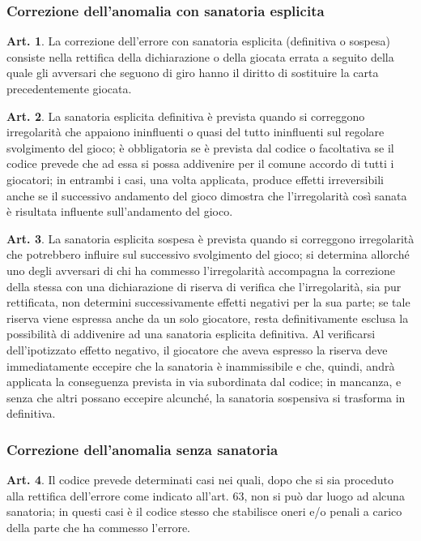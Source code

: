 \documentclass[italian,a4paper]{article}
\theoremstyle{definition}
\newtheorem{art}{Art.}
\begin{document}
\subsubsection{Correzione dell'anomalia con sanatoria esplicita}
\begin{art}
    La correzione dell'errore con sanatoria esplicita (definitiva o sospesa) consiste nella rettifica della dichiarazione o della giocata errata a seguito della quale gli avversari che seguono di giro hanno il diritto di sostituire la carta precedentemente giocata.
\end{art}
\begin{art}
    La sanatoria esplicita definitiva è prevista quando si correggono irregolarità che appaiono ininfluenti o quasi del tutto ininfluenti sul regolare svolgimento del gioco; è obbligatoria se è prevista dal codice o facoltativa se il codice prevede che ad essa si possa addivenire per il comune accordo di tutti i giocatori; in entrambi i casi, una volta applicata, produce effetti irreversibili anche se il successivo andamento del gioco dimostra che l'irregolarità così sanata è risultata influente sull'andamento del gioco.
\end{art}
\begin{art}
    La sanatoria esplicita sospesa è prevista quando si correggono irregolarità che potrebbero influire sul successivo svolgimento del gioco; si determina allorché uno degli avversari di chi ha commesso l'irregolarità accompagna la correzione della stessa con una dichiarazione di riserva di verifica che l'irregolarità, sia pur rettificata, non determini successivamente effetti negativi per la sua parte; se tale riserva viene espressa anche da un solo giocatore, resta definitivamente esclusa la possibilità di addivenire ad una sanatoria esplicita definitiva. Al verificarsi dell'ipotizzato effetto negativo, il giocatore che aveva espresso la riserva deve immediatamente eccepire che la sanatoria è inammissibile e che, quindi, andrà applicata la conseguenza prevista in via subordinata dal codice; in mancanza, e senza che altri possano eccepire alcunché, la sanatoria sospensiva si trasforma in definitiva.
\end{art}
\subsubsection{Correzione dell'anomalia senza sanatoria}
\begin{art}
    Il codice prevede determinati casi nei quali, dopo che si sia proceduto alla rettifica dell'errore come indicato all'art. 63, non si può dar luogo ad alcuna sanatoria; in questi casi è il codice stesso che stabilisce oneri e/o penali a carico della parte che ha commesso l'errore.
\end{art}
\end{document}

